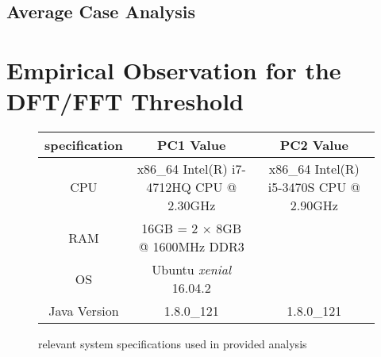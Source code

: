 \documentclass[]{article}
\begin{document}
\subsection{Average Case Analysis}

\section{Empirical Observation for the DFT/FFT Threshold}\label{sec:threshold}
\begin{figure}[h]
	\begin{center}
		\begin{tabular}{ | c | c | c | }
			\hline
			specification & PC1 Value & PC2 Value \\
			\hline
			CPU & x86\_64 Intel(R) i7-4712HQ CPU @ 2.30GHz & x86\_64 Intel(R) i5-3470S CPU @ 2.90GHz\\
			\hline
			RAM & 16GB = 2 $\times$ 8GB @ 1600MHz DDR3 & \\ 
			\hline
			OS & Ubuntu \emph{xenial} 16.04.2 & \\
			\hline
			Java Version & 1.8.0\_121 & 1.8.0\_121\\
			\hline
		\end{tabular}
	\end{center}
	\caption{relevant system specifications used in provided analysis\label{fig:specs}}
\end{figure}
\end{document}
